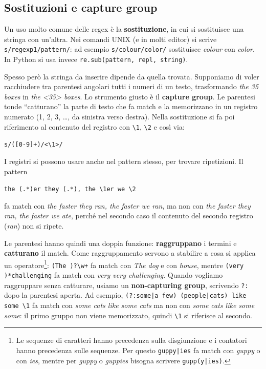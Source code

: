 \subsection{Sostituzioni e capture group}
Un uso molto comune delle regex è la \textbf{sostituzione}, in cui si sostituisce una stringa con un'altra. Nei comandi UNIX (e in molti editor) si scrive \verb|s/regexp1/pattern/|: ad esempio \verb|s/colour/color/| sostituisce \textit{colour} con \textit{color}. In Python si usa invece \verb|re.sub(pattern, repl, string)|.

Spesso però la stringa da inserire dipende da quella trovata. Supponiamo di voler racchiudere tra parentesi angolari tutti i numeri di un testo, trasformando \textit{the 35 boxes} in \textit{the <35> boxes}. Lo strumento giusto è il \textbf{capture group}. Le parentesi tonde \enquote{catturano} la parte di testo che fa match e la memorizzano in un registro numerato (1, 2, 3, \dots, da sinistra verso destra). Nella sostituzione si fa poi riferimento al contenuto del registro con \verb|\1|, \verb|\2| e così via:
\begin{center}
\verb|s/([0-9]+)/<\1>/|
\end{center}

I registri si possono usare anche nel pattern stesso, per trovare ripetizioni. Il pattern
\begin{center}
\verb|the (.*)er they (.*), the \1er we \2|
\end{center}
fa match con \textit{the faster they ran, the faster we ran}, ma non con \textit{the faster they ran, the faster we ate}, perché nel secondo caso il contenuto del secondo registro (\textit{ran}) non si ripete.

Le parentesi hanno quindi una doppia funzione: \textbf{raggruppano} i termini e \textbf{catturano} il match. Come raggruppamento servono a stabilire a cosa si applica un operatore\footnote{Le sequenze di caratteri hanno precedenza sulla disgiunzione e i contatori hanno precedenza sulle sequenze. Per questo \texttt{guppy|ies} fa match con \textit{guppy} o con \textit{ies}, mentre per \textit{guppy} o \textit{guppies} bisogna scrivere \texttt{gupp(y|ies)}.}: \verb|(The )?\w+| fa match con \textit{The dog} e con \textit{house}, mentre \verb|(very )*challenging| fa match con \textit{very very challenging}. Quando vogliamo raggruppare senza catturare, usiamo un \textbf{non-capturing group}, scrivendo \verb|?:| dopo la parentesi aperta. Ad esempio, \verb!(?:some|a few) (people|cats) like some \1! fa match con \textit{some cats like some cats} ma non con \textit{some cats like some some}: il primo gruppo non viene memorizzato, quindi \verb|\1| si riferisce al secondo.

